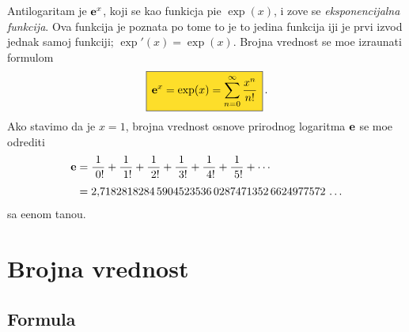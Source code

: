 \documentclass[12pt, twoside, a4paper]{article}
\def\.{\smash{,}\vphantom{.}}
\def\e{{\bf e}}
\def\okvir#1{\,\fcolorbox{black}{Goldenrod}{$\,\displaystyle{\mathstrut #1}\,$}\,}
\begin{document}
\def\ep{\hphantom{!}}
\def\rf#1!{\frac1{\hphantom{!}#1!}}
Antilogaritam je $\e^x$, koji se kao funkicja pi{\sv}e $\exp(x)$, i zove se
{\sl eksponencijalna funkcija}. Ova funkcija je poznata po tome {\sv}to je to 
jedina funkcija {\cv}iji je prvi izvod jednak samoj funkciji; $\exp'(x)=\exp(x)$. Brojna vrednost se mo{\zv}e
izra{\cv}unati formulom
\begin{equation}
\label{eq:exp}
\okvir{\e^x=\exp(x)=\sum_{n=0}^\infty\frac{x^n}{n!}}.
\end{equation}
Ako stavimo da je $x=1$,
brojna vrednost osnove prirodnog logaritma $\e$ se mo{\zv}e odrediti
\begin{equation}
\label{eq:e}
\begin{aligned}
\e
&=\rf0!+\rf1!+\rf2!+\rf3!+\rf4!+\rf5!+\cdots\\
\noalign{\smallskip}
&=2\.
7182818284\,
5904523536\,
0287471352\,
6624977572\,\ldots
\end{aligned}
\end{equation}
sa {\zv}e{\lj}enom ta{\cv}no{\sv}{\cc}u.


\section{Brojna vrednost}

\subsection{Formula}
\end{document}
